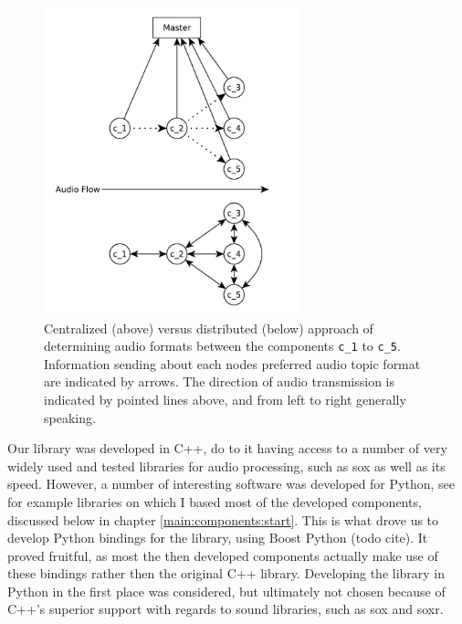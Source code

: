 \begin{figure}[]
	\centering
	\includegraphics[width=0.66\textwidth]{diagrams/lib_central_vs_dist.pdf}
	\caption{Centralized (above) versus distributed (below) approach of determining audio formats between the components \texttt{c\_1} to \texttt{c\_5}.
		Information sending about each nodes preferred audio topic format are indicated by arrows.
		The direction of audio transmission is indicated by pointed lines above, and from left to right generally speaking.}
	\label{pic:main:lib:central_vs_dist}
\end{figure}

Our library was developed in C++, do to it having access to a number of very widely used and tested libraries for audio processing, such as \gls{sox} as well as its speed.
However, a number of interesting software was developed for Python, see for example libraries on which I based most of the developed components, discussed below in chapter \ref{main:components:start}.
This is what drove us to develop Python bindings for the library, using Boost Python (todo cite).
It proved fruitful, as most the then developed components actually make use of these bindings rather then the original C++ library.
Developing the library in Python in the first place was considered, but ultimately not chosen because of C++'s superior support with regards to sound libraries, such as \gls{sox} and \gls{soxr}.

